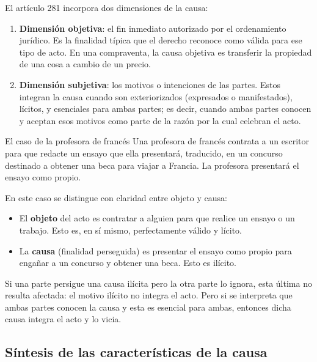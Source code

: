 \documentclass[12pt,oneside]{book}
\begin{document}
El artículo 281 incorpora dos dimensiones de la causa:

\begin{enumerate}
    \item \textbf{Dimensión objetiva}: el fin inmediato autorizado por el ordenamiento jurídico. Es la finalidad típica que el derecho reconoce como válida para ese tipo de acto. En una compraventa, la causa objetiva es transferir la propiedad de una cosa a cambio de un precio.
    \item \textbf{Dimensión subjetiva}: los motivos o intenciones de las partes. Estos integran la causa cuando son exteriorizados (expresados o manifestados), lícitos, y esenciales para ambas partes; es decir, cuando ambas partes conocen y aceptan esos motivos como parte de la razón por la cual celebran el acto.
\end{enumerate}

\begin{example}{El caso de la profesora de francés}
Una profesora de francés contrata a un escritor para que redacte un ensayo que ella presentará, traducido, en un concurso destinado a obtener una beca para viajar a Francia. La profesora presentará el ensayo como propio.

En este caso se distingue con claridad entre objeto y causa:
\begin{itemize}
    \item El \textbf{objeto} del acto es contratar a alguien para que realice un ensayo o un trabajo. Esto es, en sí mismo, perfectamente válido y lícito.
    \item La \textbf{causa} (finalidad perseguida) es presentar el ensayo como propio para engañar a un concurso y obtener una beca. Esto es ilícito.
\end{itemize}

Si una parte persigue una causa ilícita pero la otra parte lo ignora, esta última no resulta afectada: el motivo ilícito no integra el acto. Pero si se interpreta que ambas partes conocen la causa y esta es esencial para ambas, entonces dicha causa integra el acto y lo vicia.
\end{example}

\subsection{Síntesis de las características de la causa}
\end{document}

